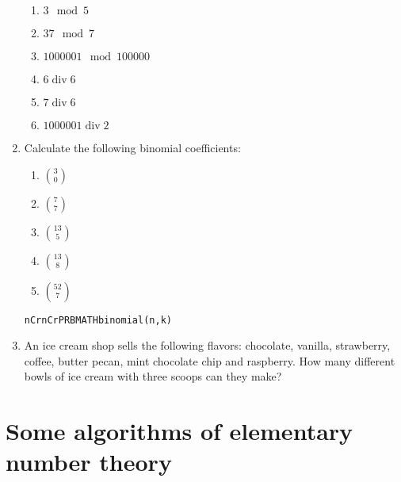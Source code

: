 \documentclass[10pt,]{book}
\theoremstyle{plain}
\theoremstyle{definition}
\theoremstyle{definition}
\numberwithin{equation}{section}
\newcommand{\hint}[1]{ }
\newcommand{\tdiv}{\; \mbox{div} \;}
\begin{document}
\begin{enumerate}[label=(\alph*)]
\begin{enumerate}[label=\roman*.]
\item\hypertarget{li-74}{}
            \(3 \mod 5\)
\item\hypertarget{li-75}{}
            \(37 \mod 7\)
\item\hypertarget{li-76}{}
            \(1000001 \mod 100000\)
\item\hypertarget{li-77}{}
            \(6 \tdiv 6\)
\item\hypertarget{li-78}{}
            \(7 \tdiv 6\)
\item\hypertarget{li-79}{}
            \(1000001 \tdiv 2\)
\end{enumerate}

\item\hypertarget{li-80}{}
      Calculate the following binomial coefficients:

\begin{enumerate}[label=\roman*.]
\item\hypertarget{li-81}{}
            \(\binom{3}{0}\)
\item\hypertarget{li-82}{}
            \(\binom{7}{7}\)
\item\hypertarget{li-83}{}
            \(\binom{13}{5}\)
\item\hypertarget{li-84}{}
            \(\binom{13}{8}\)
\item\hypertarget{li-85}{}
            \(\binom{52}{7}\)
\end{enumerate}

\lstinline?nCr?\textemdash{}\lstinline?nCr?\lstinline?PRB?\lstinline?MATH?\lstinline?binomial(n,k)?\item\hypertarget{li-86}{}
          An ice cream shop sells the following flavors: chocolate, vanilla, 
          strawberry, coffee, butter pecan, mint chocolate chip and raspberry.
          How many different bowls of ice cream \textemdash{} with three scoops \textemdash{} can they make?  



          \hint{You're choosing three things out of a set of size seven\dots{}}
\end{enumerate}
\typeout{************************************************}
\typeout{************************************************}
\section[{Some algorithms of elementary number theory}]{Some algorithms of elementary number theory}\label{sec_alg}
\end{document}
